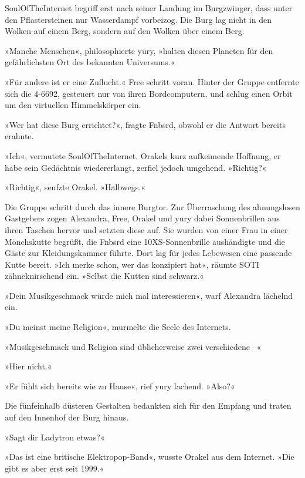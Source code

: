 
SoulOfTheInternet begriff erst nach seiner Landung im Burgzwinger, dass unter den Pflastersteinen nur Wasserdampf vorbeizog. Die Burg lag nicht in den Wolken auf einem Berg, sondern auf den Wolken über einem Berg.

»Manche Menschen«, philosophierte yury, »halten diesen Planeten für den gefährlichsten Ort des bekannten Universums.«

»Für andere ist er eine Zuflucht.« Free schritt voran. Hinter der Gruppe entfernte sich die 4-6692, gesteuert nur von ihren Bordcomputern, und schlug einen Orbit um den virtuellen Himmelskörper ein.

»Wer hat diese Burg errichtet?«, fragte Fnbsrd, obwohl er die Antwort bereits erahnte.

»Ich«, vermutete SoulOfTheInternet. Orakels kurz aufkeimende Hoffnung, er habe sein Gedächtnis wiedererlangt, zerfiel jedoch umgehend. »Richtig?«

»Richtig«, seufzte Orakel. »Halbwegs.«

Die Gruppe schritt durch das innere Burgtor. Zur Überraschung des ahnungslosen Gastgebers zogen Alexandra, Free, Orakel und yury dabei Sonnenbrillen aus ihren Taschen hervor und setzten diese auf. Sie wurden von einer Frau in einer Mönchskutte begrüßt, die Fnbsrd eine 10XS-Sonnenbrille aushändigte und die Gäste zur Kleidungskammer führte. Dort lag für jedes Lebewesen eine passende Kutte bereit. »Ich merke schon, wer das konzipiert hat«, räumte SOTI zähneknirschend ein. »Selbst die Kutten sind schwarz.«

»Dein Musikgeschmack würde mich mal interessieren«, warf Alexandra lächelnd ein.

»Du meinst meine Religion«, murmelte die Seele des Internets.

»Musikgeschmack und Religion sind üblicherweise zwei verschiedene –«

»Hier nicht.«

»Er fühlt sich bereits wie zu Hause«, rief yury lachend. »Also?«

Die fünfeinhalb düsteren Gestalten bedankten sich für den Empfang und traten auf den Innenhof der Burg hinaus.

»Sagt dir Ladytron etwas?«

»Das ist eine britische Elektropop-Band«, wusste Orakel aus dem Internet. »Die gibt es aber erst seit 1999.«

